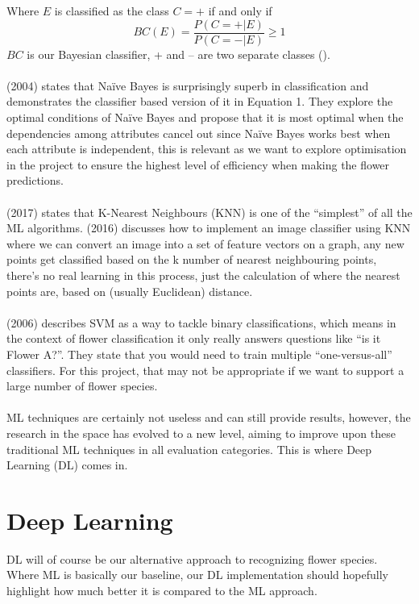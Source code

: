 \documentclass{article}
\begin{document}
Where \(E\) is classified as the class \(C = +\) if and only if
\[BC(E) = \frac{P(C = +|E)}{P(C = -|E)} \geq 1\]
\(BC\) is our Bayesian classifier, + and – are two separate classes (\cite{zhang2004optimality}).
\\
\\
\citeauthor{zhang2004optimality} (2004) states that Naïve Bayes is surprisingly superb in classification and 
demonstrates the classifier based version of it in Equation 1. They explore the optimal conditions of Naïve Bayes and propose
 that it is most optimal when the dependencies among attributes cancel out since Naïve Bayes works best when each 
 attribute is independent, this is relevant as we want to explore optimisation in the project to ensure the highest 
 level of efficiency when making the flower predictions.
 \\
 \\
 \citeauthor{MohammedMohssen2017Ml:a} (2017) states that K-Nearest Neighbours (KNN) is one of the “simplest” of  all the ML algorithms. 
 \citeauthor{rosebook2016} (2016) discusses how to implement an image classifier using KNN where we can convert an image into a set 
 of feature vectors on a graph, any new points get classified based on the k number of nearest neighbouring points, 
 there’s no real learning in this process, just the calculation of where the nearest points are, based on
 (usually Euclidean) distance.
 \\
 \\
 \citeauthor{NobleWilliamS2006Wias} (2006) describes SVM as a way to tackle binary classifications, which means in the context of flower 
 classification it only really answers questions like “is it Flower A?”. They state that you would need to train 
 multiple “one-versus-all” classifiers. For this project, that may not be appropriate if we want to support a large 
 number of flower species.
 \\
 \\
 ML techniques are certainly not useless and can still provide results, however, the research in the space has evolved 
 to a new level, aiming to improve upon these traditional ML techniques in all evaluation categories. This is where Deep
  Learning (DL) comes in.
\section{Deep Learning}
DL will of course be our alternative approach to recognizing flower species. Where ML is basically our baseline, our DL 
implementation should hopefully highlight how much better it is compared to the ML approach.
\end{document}
